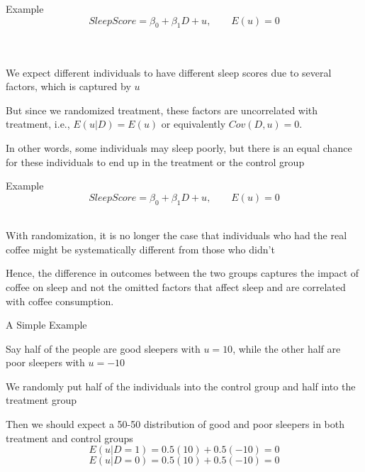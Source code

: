 \documentclass{./../div_teaching_slides}
\begin{document}
\begin{frame}{Example}
\vspace{-1em}
$$ Sleep Score = \beta_0 + \beta_1 D + u , \quad \quad E(u)=0 $$ \\~\\
\begin{witemize}
  \item We expect different individuals to have different sleep scores due to several factors, which is captured by $u$
  \item But since we randomized treatment, these factors are uncorrelated with treatment, i.e., $E(u|D)=E(u)$ or equivalently $Cov(D,u)=0$.
  \item In other words, some individuals may sleep poorly, but there is an equal chance for these individuals to end up in the treatment or the control group
\end{witemize}
\end{frame}

\begin{frame}{Example}
\vspace{-1em}
$$ Sleep Score = \beta_0 + \beta_1 D + u , \quad \quad E(u)=0 $$ \\
\begin{witemize}
  \item With randomization, it is no longer the case that individuals who had the real coffee might be systematically different from those who didn't 
  \item Hence, the difference in outcomes between the two groups captures the impact of coffee on sleep and not the omitted factors that affect sleep and are correlated with coffee consumption. 
 \end{witemize}
\end{frame}

\begin{frame}{A Simple Example}
\begin{witemize}
  \item Say half of the people are good sleepers with $u=10$, while the other half are poor sleepers with $u = -10$
  \item We randomly put half of the individuals into the control group and half into the treatment group
  \item Then we should expect a 50-50 distribution of good and poor sleepers in both treatment and control groups
  $$ E(u|D=1) = 0.5(10) + 0.5(-10) = 0 $$
  $$ E(u|D=0) = 0.5(10) + 0.5(-10) = 0 $$
\end{witemize}
\end{frame}
\end{document}
